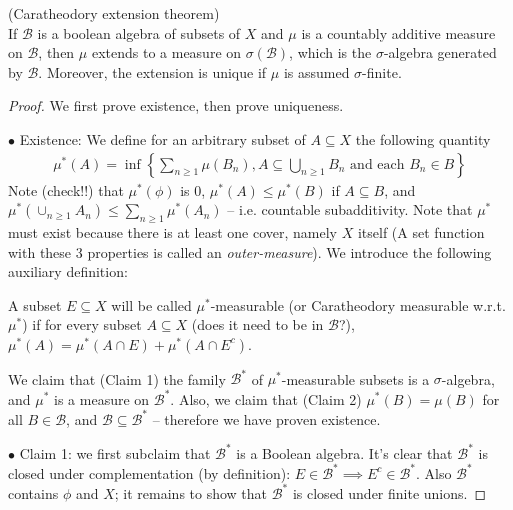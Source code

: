 \documentclass[a4paper]{article}
\begin{document}
\begin{thm} (Caratheodory extension theorem)\\
If $\mathcal{B}$ is a boolean algebra of subsets of $X$ and $\mu$ is a countably additive measure on $\mathcal{B}$, then $\mu$ extends to a measure on $\sigma(\mathcal{B})$, which is the $\sigma$-algebra generated by $\mathcal{B}$. Moreover, the extension is unique if $\mu$ is assumed $\sigma$-finite.
\begin{proof}
We first prove existence, then prove uniqueness.

$\bullet$ Existence: We define for an arbitrary subset of $A \subseteq X$ the following quantity
\begin{equation*}
\begin{aligned}
\mu^*(A) = \inf\left\{\sum_{n \geq 1} \mu(B_n),A \subseteq \bigcup_{n \geq 1} B_n \text{ and each } B_n \in B\right\}
\end{aligned}
\end{equation*}
Note (check!!) that $\mu^*(\phi)$ is $0$, $\mu^*(A) \leq \mu^*(B)$ if $A \subseteq B$, and $\mu^*(\cup_{n \geq 1} A_n) \leq \sum_{n \geq 1} \mu^* (A_n)$ -- i.e. countable subadditivity. Note that $\mu^*$ must exist because there is at least one cover, namely $X$ itself (A set function with these 3 properties is called an \emph{outer-measure}). We introduce the following auxiliary definition:

\begin{defi}
A subset $E \subseteq X$ will be called $\mu^*$-measurable (or Caratheodory measurable w.r.t. $\mu^*$) if for every subset $A \subseteq X$ (does it need to be in $\mathcal{B}$?), $\mu^*(A) = \mu^*(A \cap E) + \mu^*(A \cap E^c)$.
\end{defi}

We claim that (Claim 1) the family $\mathcal{B}^*$ of $\mu^*$-measurable subsets is a $\sigma$-algebra, and $\mu^*$ is a measure on $\mathcal{B}^*$. Also, we claim that (Claim 2) $\mu^*(B) = \mu(B)$ for all $B \in \mathcal{B}$, and $\mathcal{B} \subseteq \mathcal{B}^*$ -- therefore we have proven existence.

$\bullet$ Claim 1: we first subclaim that $\mathcal{B}^*$ is a Boolean algebra. It's clear that $\mathcal{B}^*$ is closed under complementation (by definition): $E \in \mathcal{B}^* \implies E^c \in \mathcal{B}^*$. Also $\mathcal{B}^*$ contains $\phi$ and $X$; it remains to show that $\mathcal{B}^*$ is closed under finite unions.


\end{proof}
\end{thm}
\end{document}
